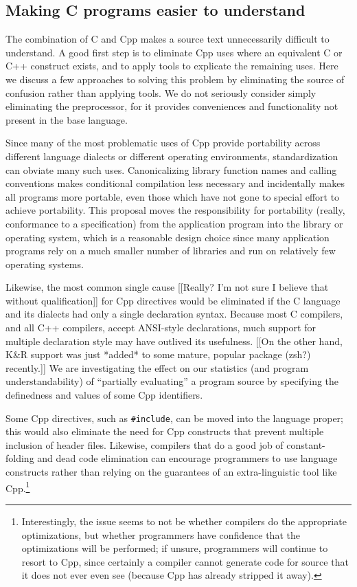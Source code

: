 \documentclass[10pt]{article}
\begin{document}
\subsection{Making C programs easier to understand}

The combination of C and Cpp makes a source text unnecessarily difficult to
understand.  A good first step is to eliminate Cpp uses where an equivalent
C or C++ construct exists, and to apply tools to explicate the remaining
uses.  Here we discuss a few approaches to solving this problem by
eliminating the source of confusion rather than applying tools.  We do not
seriously consider simply eliminating the preprocessor, for it provides
conveniences and functionality not present in the base language.

Since many of the most problematic uses of Cpp provide portability across
different language dialects or different operating environments,
standardization can obviate many such uses.  Canonicalizing library
function names and calling conventions makes conditional compilation less
necessary and incidentally makes all programs more portable, even those
which have not gone to special effort to achieve portability.  This
proposal moves the responsibility for portability (really, conformance to a
specification) from the application program into the library or operating
system, which is a reasonable design choice since many application programs
rely on a much smaller number of libraries and run on relatively few
operating systems.

Likewise, the most common single cause [[Really?  I'm not sure I believe
that without qualification]] for Cpp directives would be eliminated if the
C language and its dialects had only a single declaration syntax.  Because
most C compilers, and all C++ compilers, accept ANSI-style declarations,
much support for multiple declaration style may have outlived its
usefulness.  [[On the other hand, K\&R support was just *added* to some
mature, popular package (zsh?) recently.]]  We are investigating the effect
on our statistics (and program understandability) of ``partially
evaluating'' a program source by specifying the definedness and values of
some Cpp identifiers.

Some Cpp directives, such as {\tt \#include}, can be moved into the
language proper; this would also eliminate the need for Cpp constructs that
prevent multiple inclusion of header files.  Likewise, compilers that do a
good job of constant-folding and dead code elimination can encourage
programmers to use language constructs rather than relying on the
guarantees of an extra-linguistic tool like Cpp.\footnote{Interestingly,
  the issue seems to not be whether compilers do the appropriate
  optimizations, but whether programmers have confidence that the
  optimizations will be performed; if unsure, programmers will continue to
  resort to Cpp, since certainly a compiler cannot generate code for source
  that it does not ever even see (because Cpp has already stripped it
  away).}
\end{document}

